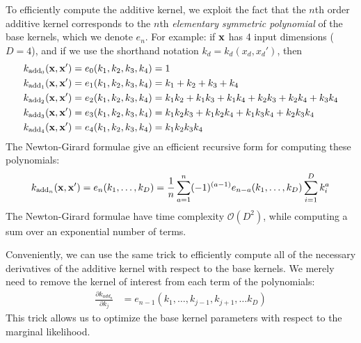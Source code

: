 To efficiently compute the additive kernel, we exploit the fact that the $n$th order additive kernel corresponds to the $n$th \textit{elementary symmetric polynomial} \citep{macdonald1998symmetric}
of the base kernels, which we denote $e_n$.
For example:  if ${\bf{x}}$ has 4 input dimensions ($D = 4$), and if we use the shorthand notation $k_d = k_d(x_d, x_d')$, then
%
\begin{align}
k_{\textnormal{add}_0}({\bf x, x'}) & = e_0( k_1, k_2, k_3, k_4 ) = 1 \\
k_{\textnormal{add}_1}({\bf x, x'}) & = e_1( k_1, k_2, k_3, k_4 ) = k_1 + k_2 + k_3 + k_4 \\
k_{\textnormal{add}_2}({\bf x, x'}) & = e_2( k_1, k_2, k_3, k_4 ) = k_1 k_2 + k_1 k_3 + k_1k_4 + k_2 k_3 + k_2 k_4 + k_3 k_4 \\
k_{\textnormal{add}_3}({\bf x, x'}) & = e_3( k_1, k_2, k_3, k_4 ) = k_1 k_2 k_3 + k_1 k_2 k_4 + k_1 k_3 k_4 + k_2 k_3 k_4 \\
k_{\textnormal{add}_4}({\bf x, x'}) & = e_4( k_1, k_2, k_3, k_4 ) = k_1 k_2 k_3 k_4
\end{align}
%
The Newton-Girard formulae give an efficient recursive form for computing these polynomials:
%
\begin{align}
k_{\textnormal{add}_n}({\bf x, x'}) = e_n(k_1,\dots,k_D) = \frac{1}{n} \sum_{a=1}^n (-1)^{(a-1)} e_{n-a}(k_1,\dots,k_D)  \sum_{i=1}^Dk_i^a
\end{align}
%
The Newton-Girard formulae have time complexity $\mathcal{O}( D^2 )$, while computing a sum over an exponential number of terms.

Conveniently, we can use the same trick to efficiently compute all of the necessary derivatives of the additive kernel with respect to the base kernels.
We merely need to remove the kernel of interest from each term of the polynomials:
%
\begin{align}
\frac{\partial k_{add_n}}{\partial k_j} & = e_{n-1}(k_1,\dots,k_{j-1},k_{j+1}, \dots k_D)
\end{align}
%
This trick allows us to optimize the base kernel parameters with respect to the marginal likelihood.

